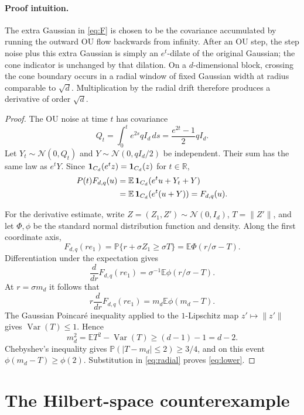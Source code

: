 \documentclass[11pt]{article}
\newcommand{\E}{\mathbb E}
\newcommand{\R}{\mathbb R}
\newcommand{\cN}{\mathcal N}
\begin{document}
\paragraph{Proof intuition.}
The extra Gaussian in \eqref{eq:F} is chosen to be the covariance accumulated
by running the outward OU flow backwards from infinity.  After an OU step,
the step noise plus this extra Gaussian is simply an $e^t$-dilate of the
original Gaussian; the cone indicator is unchanged by that dilation.  On a
$d$-dimensional block, crossing the cone boundary occurs in a radial window
of fixed Gaussian width at radius comparable to $\sqrt d$.  Multiplication
by the radial drift therefore produces a derivative of order $\sqrt d$.

\begin{proof}
The OU noise at time $t$ has covariance
\[
       Q_t=\int_0^t e^{2s}qI_d\,ds
           =\frac{e^{2t}-1}{2}qI_d.
\]
Let $Y_t\sim\cN(0,Q_t)$ and
$Y\sim\cN(0,qI_d/2)$ be independent.  Their sum has the same law as
$e^tY$.  Since ${\bf1}_{C_d}(e^tz)={\bf1}_{C_d}(z)$ for $t\in\R$,
\[
\begin{aligned}
 P(t)F_{d,q}(u)
 &=\E\,{\bf1}_{C_d}(e^tu+Y_t+Y)\\
 &=\E\,{\bf1}_{C_d}(e^t(u+Y))
  =F_{d,q}(u).
\end{aligned}
\]

For the derivative estimate, write $Z=(Z_1,Z')\sim\cN(0,I_d)$,
$T=\lVert Z'\rVert$, and let $\Phi,\phi$ be the standard normal
distribution function and density.  Along the first coordinate axis,
\[
 F_{d,q}(re_1)
 =\mathbb P\{r+\sigma Z_1\ge\sigma T\}
 =\E\Phi(r/\sigma-T).
\]
Differentiation under the expectation gives
\[
 \frac d{dr}F_{d,q}(re_1)
       =\sigma^{-1}\E\phi(r/\sigma-T).
\]
At $r=\sigma m_d$ it follows that
\begin{equation}\label{eq:radial}
 r\frac d{dr}F_{d,q}(re_1)
       =m_d\E\phi(m_d-T).
\end{equation}
The Gaussian Poincar\'e inequality applied to the $1$-Lipschitz map
$z'\mapsto\lVert z'\rVert$ gives
$\operatorname{Var}(T)\le1$.  Hence
\[
 m_d^2=\E T^2-\operatorname{Var}(T)
       \ge(d-1)-1=d-2.
\]
Chebyshev's inequality gives
$\mathbb P(|T-m_d|\le2)\ge3/4$, and on this event
$\phi(m_d-T)\ge\phi(2)$.  Substitution in \eqref{eq:radial} proves
\eqref{eq:lower}.
\end{proof}

\section{The Hilbert-space counterexample}
\end{document}

